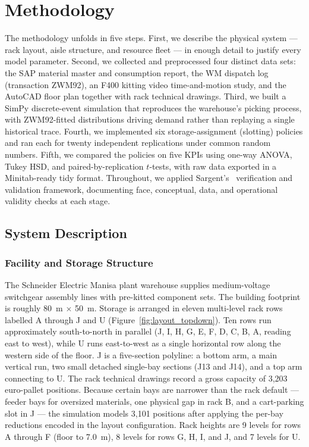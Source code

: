 \section{Methodology}\label{sec:method}

The methodology unfolds in five steps. First, we describe the physical system — rack layout, aisle structure, and resource fleet — in enough detail to justify every model parameter. Second, we collected and preprocessed four distinct data sets: the SAP material master and consumption report, the WM dispatch log (transaction ZWM92), an F400 kitting video time-and-motion study, and the AutoCAD floor plan together with rack technical drawings. Third, we built a SimPy discrete-event simulation that reproduces the warehouse's picking process, with ZWM92-fitted distributions driving demand rather than replaying a single historical trace. Fourth, we implemented six storage-assignment (slotting) policies and ran each for twenty independent replications under common random numbers. Fifth, we compared the policies on five KPIs using one-way ANOVA, Tukey HSD, and paired-by-replication $t$-tests, with raw data exported in a Minitab-ready tidy format. Throughout, we applied Sargent's~\cite{sargent2013} verification and validation framework, documenting face, conceptual, data, and operational validity checks at each stage.

\subsection{System Description}\label{sec:system}

\subsubsection{Facility and Storage Structure}

The Schneider Electric Manisa plant warehouse supplies medium-voltage switchgear assembly lines with pre-kitted component sets. The building footprint is roughly 80~m $\times$ 50~m. Storage is arranged in eleven multi-level rack rows labelled A through J and U (Figure~\ref{fig:layout_topdown}). Ten rows run approximately south-to-north in parallel (J, I, H, G, E, F, D, C, B, A, reading east to west), while U runs east-to-west as a single horizontal row along the western side of the floor. J is a five-section polyline: a bottom arm, a main vertical run, two small detached single-bay sections (J13 and J14), and a top arm connecting to U. The rack technical drawings record a gross capacity of 3,203 euro-pallet positions. Because certain bays are narrower than the rack default — feeder bays for oversized materials, one physical gap in rack B, and a cart-parking slot in J — the simulation models 3,101 positions after applying the per-bay reductions encoded in the layout configuration. Rack heights are 9 levels for rows A through F (floor to 7.0~m), 8 levels for rows G, H, I, and J, and 7 levels for U.

